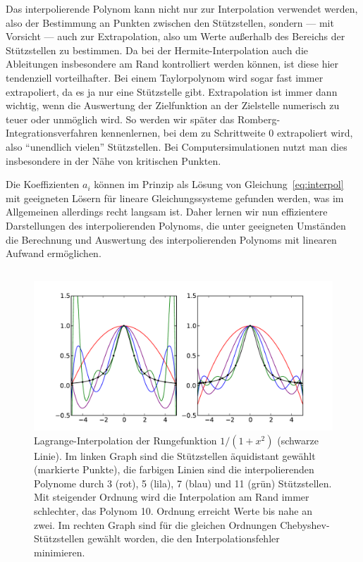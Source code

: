 Das interpolierende Polynom kann nicht nur zur Interpolation verwendet
werden, also der Bestimmung an Punkten zwischen den Stützstellen,
sondern --- mit Vorsicht --- auch zur
Extrapolation, also um Werte außerhalb des
Bereichs der Stützstellen zu bestimmen. Da bei der
Hermite-Interpolation auch die Ableitungen insbesondere am Rand
kontrolliert werden können, ist diese hier tendenziell
vorteilhafter. Bei einem Taylorpolynom wird sogar fast immer
extrapoliert, da es ja nur eine Stützstelle gibt. Extrapolation ist
immer dann wichtig, wenn die Auswertung der Zielfunktion an der
Zielstelle numerisch zu teuer oder unmöglich wird. So werden wir
später das Romberg-Integrationsverfahren kennenlernen, bei dem zu
Schrittweite 0 extrapoliert wird, also \enquote{unendlich vielen}
Stützstellen. Bei Computersimulationen nutzt man dies insbesondere in
der Nähe von kritischen Punkten.

Die Koeffizienten $a_i$ können im Prinzip als Lösung von
Gleichung~\eqref{eq:interpol} mit geeigneten Lösern für lineare
Gleichungssysteme gefunden werden, was im Allgemeinen allerdings recht
langsam ist. Daher lernen wir nun effizientere Darstellungen des
interpolierenden Polynoms, die unter geeigneten Umständen die
Berechnung und Auswertung des interpolierenden Polynoms mit linearen
Aufwand ermöglichen.


\subsection{}

\begin{figure}
  \centering
  \includegraphics[width=\textwidth]{plots/runge_lagrange}
  \caption{Lagrange-Interpolation der Rungefunktion $1/(1+x^2)$
    (schwarze Linie). Im linken Graph sind die Stützstellen
    äquidistant gewählt (markierte Punkte), die farbigen Linien sind
    die interpolierenden Polynome durch 3 (rot), 5 (lila), 7 (blau)
    und 11 (grün) Stützstellen. Mit steigender Ordnung wird die
    Interpolation am Rand immer schlechter, das Polynom 10. Ordnung
    erreicht Werte bis nahe an zwei. Im rechten Graph sind
    für die gleichen Ordnungen Chebyshev-Stützstellen gewählt worden,
    die den Interpolationsfehler minimieren.}
  \label{fig:runge}
\end{figure}

